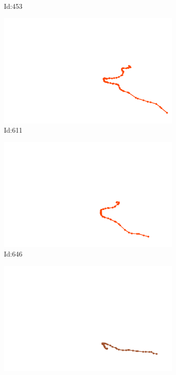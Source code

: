 \documentclass[12pt,twoside]{report}
\begin{document}
\begin{figure}
\begin{subfigure}[b]{0.20\textwidth}
\caption{Id:453}
\end{subfigure}
\begin{subfigure}[b]{0.20\textwidth}
\centering
\includegraphics[width=\textwidth]{../../trajectories/611.png}
\caption{Id:611}
\end{subfigure}
\begin{subfigure}[b]{0.20\textwidth}
\centering
\includegraphics[width=\textwidth]{../../trajectories/646.png}
\caption{Id:646}
\end{subfigure}
\begin{subfigure}[b]{0.20\textwidth}
\centering
\includegraphics[width=\textwidth]{../../trajectories/740.png}

\end{subfigure}
\end{figure}
\end{document}
